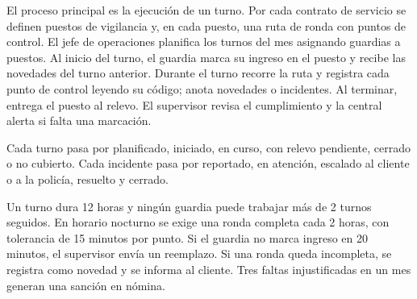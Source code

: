 \documentclass[11pt]{article}
\begin{document}
El proceso principal es la ejecución de un turno. Por cada contrato de servicio se definen puestos de vigilancia y, en cada puesto, una ruta de ronda con puntos de control. El jefe de operaciones planifica los turnos del mes asignando guardias a puestos. Al inicio del turno, el guardia marca su ingreso en el puesto y recibe las novedades del turno anterior. Durante el turno recorre la ruta y registra cada punto de control leyendo su código; anota novedades o incidentes. Al terminar, entrega el puesto al relevo. El supervisor revisa el cumplimiento y la central alerta si falta una marcación.

Cada turno pasa por planificado, iniciado, en curso, con relevo pendiente, cerrado o no cubierto. Cada incidente pasa por reportado, en atención, escalado al cliente o a la policía, resuelto y cerrado.

Un turno dura 12 horas y ningún guardia puede trabajar más de 2 turnos seguidos. En horario nocturno se exige una ronda completa cada 2 horas, con tolerancia de 15 minutos por punto. Si el guardia no marca ingreso en 20 minutos, el supervisor envía un reemplazo. Si una ronda queda incompleta, se registra como novedad y se informa al cliente. Tres faltas injustificadas en un mes generan una sanción en nómina.



\end{document}
